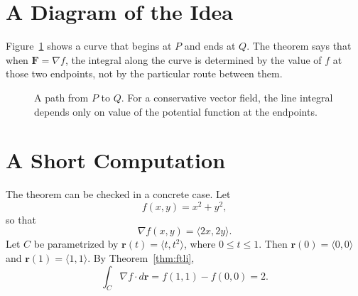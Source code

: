 \section{A Diagram of the Idea}
\label{sec:ftli-diagram}

Figure~\ref{fig:ftli-path} shows a curve that begins at \(P\) and ends at \(Q\). The theorem says that when \(\mathbf F = \nabla f\), the integral along the curve is determined by the value of \(f\) at those two endpoints, not by the particular route between them.

\begin{figure}[htbp]
\centering
{}
\caption[A path in the xy-plane illustrating the major conclusion of the FTLI.]{A path from \(P\) to \(Q.\) For a conservative vector field, the line integral depends only on value of the potential function at the endpoints.}
\label{fig:ftli-path}
\end{figure}

\section{A Short Computation}
\label{sec:ftli-example}

The theorem can be checked in a concrete case. Let
\[
f(x,y)=x^2+y^2,
\]
so that
\[
\nabla f(x,y)=\langle 2x,2y\rangle.
\]
Let \(C\) be parametrized by \(\mathbf r(t)=\langle t,t^2\rangle\), where \(0\leq t\leq 1\). Then \(\mathbf r(0)=\langle 0,0\rangle\) and \(\mathbf r(1)=\langle 1,1\rangle\). By Theorem~\ref{thm:ftli},
\[
\int_C \nabla f \cdot d\mathbf r
= f(1,1)-f(0,0)
= 2.
\]


